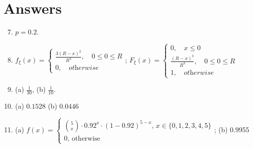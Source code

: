 \documentclass[14pt]{exam}
\begin{document}
\begin{questions}
		




		
 	\end{questions}
 	
 	
 	
 	
 	\pagebreak
 	\section*{Answers}
 	\begin{enumerate}
 	
 		\setcounter{enumi}{6}
 		\item $p = 0.2$.
 		\item $f_\xi(x) = \begin{cases}\frac{3 (R - x) ^ 2}{R^3}, \quad 0 \leq 0 \leq R \\ 0, \quad \textit{otherwise}\end{cases}$; $F_\xi(x) = \begin{cases}0, \quad x \leq 0 \\ \frac{(R - x) ^ 3}{R^3}, \quad 0 \leq 0 \leq R \\ 1, \quad \textit{otherwise}\end{cases}$
 		\item (a) $\frac{1}{30}$, (b) $\frac{1}{10}$.
 		\item (a) $0.1528$ (b) $0.0446$
 		\item (a) $f(x) = \begin{cases}
			\binom{5}{x} \cdot 0.92^x \cdot (1 - 0.92)^{5 - x},\, x \in \{0, 1, 2, 3, 4, 5\}\\
			0,\, \text{otherwise}
		\end{cases}$; (b) 0.9955
 	\end{enumerate}
\end{document}
